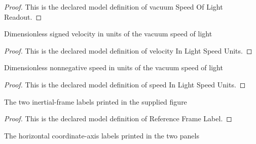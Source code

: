 \begin{proof}
  This is the declared model definition of vacuum Speed Of Light Readout.
\end{proof}
\begin{definition}
  \label{def:physics:phyx-mini-0527:phyxminiproblems-problemphyxmini0527-velocityinlightspeedunits}
  Dimensionless signed velocity in units of the vacuum speed of light
\end{definition}
\begin{proof}
  This is the declared model definition of velocity In Light Speed Units.
\end{proof}
\begin{definition}
  \label{def:physics:phyx-mini-0527:phyxminiproblems-problemphyxmini0527-speedinlightspeedunits}
  Dimensionless nonnegative speed in units of the vacuum speed of light
\end{definition}
\begin{proof}
  This is the declared model definition of speed In Light Speed Units.
\end{proof}
\begin{definition}
  \label{def:physics:phyx-mini-0527:phyxminiproblems-problemphyxmini0527-referenceframelabel}
  The two inertial-frame labels printed in the supplied figure
\end{definition}
\begin{proof}
  This is the declared model definition of Reference Frame Label.
\end{proof}
\begin{definition}
  \label{def:physics:phyx-mini-0527:phyxminiproblems-problemphyxmini0527-coordinateaxislabel}
  The horizontal coordinate-axis labels printed in the two panels
\end{definition}
